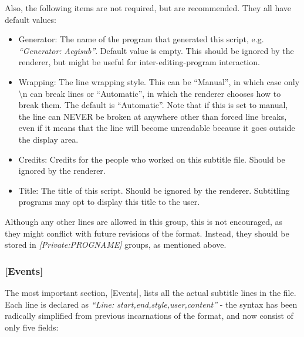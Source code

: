 \documentclass{spec}
\begin{document}
Also, the following items are not required, but are recommended. They all have default values:

\begin{itemize}
\item Generator: The name of the program that generated this script, e.g. \textit{"`Generator: Aegisub"'}.
Default value is empty. This should be ignored by the renderer, but might be useful for inter-editing-program
interaction.
\item Wrapping: The line wrapping style. This can be "`Manual"', in which case only \textbackslash{n} can
break lines or "`Automatic"', in which the renderer chooses how to break them. The default is "`Automatic"'.
Note that if this is set to manual, the line can NEVER be broken at anywhere other than forced line breaks,
even if it means that the line will become unreadable because it goes outside the display area.
\item Credits: Credits for the people who worked on this subtitle file. Should be ignored by the renderer.
\item Title: The title of this script. Should be ignored by the renderer. Subtitling programs may opt to display
this title to the user.
\end{itemize}

Although any other lines are allowed in this group, this is not encouraged, as they might conflict
with future revisions of the format. Instead, they should be stored in \textit{[Private:PROGNAME]} groups,
as mentioned above.

\subsubsection{[Events]}

The most important section, [Events], lists all the actual subtitle lines in the file. Each line is
declared as \emph{"`Line: start,end,style,user,content"'} - the syntax has been radically simplified from
previous incarnations of the format, and now consist of only five fields:
\end{document}
